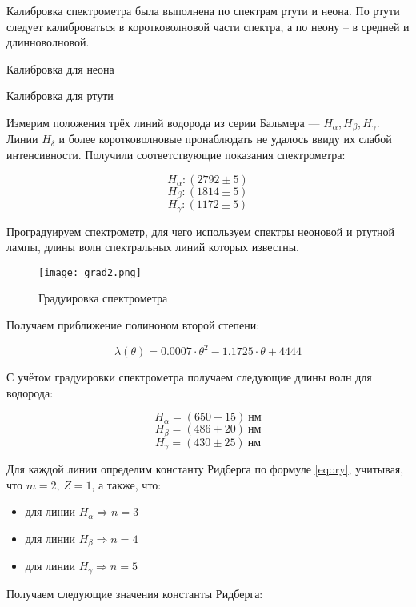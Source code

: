 Калибровка спектрометра была выполнена по спектрам ртути и неона. По ртути
следует калиброваться в коротковолновой части спектра, а по неону -- в средней и
длинноволновой.

\begin{table}[h!]
  \centering
  \caption{Калибровка для неона}
  
  \label{tb1}
\end{table}

\begin{table}[h!]
  \centering
  \caption{Калибровка для ртути}
  
  \label{tb2}
\end{table}

Измерим положения трёх линий водорода из серии Бальмера --- $H_{\alpha},
  H_{\beta}, H_{\gamma}$. Линии $H_{\delta}$ и более коротковолновые
пронаблюдать не удалось ввиду их слабой интенсивности.  Получили
соответствующие показания спектрометра:

\[  H_{\alpha}: (2792\pm 5) \]
\[  H_{\beta} : (1814 \pm 5) \]
\[ H_{\gamma} : (1172 \pm 5) \]

Проградуируем спектрометр, для чего используем спектры неоновой и ртутной
лампы, длины волн спектральных линий которых известны.

\begin{figure}[h!]
  \centering
  \texttt{[image: grad2.png]}
  \caption{Градуировка спектрометра}
  \label{al}
\end{figure}

Получаем приближение полиноном второй степени:

\[ \lambda\left(\theta\right) = 0.0007\cdot\theta^{2} - 1.1725\cdot \theta + 4444 \]


С учётом градуировки спектрометра получаем следующие длины волн для
водорода:


\[  H_{\alpha} = (650\pm 15)\ \text{нм} \]
\[  H_{\beta} = (486\pm 20)\ \text{нм} \]
\[  H_{\gamma} = (430\pm  25)\  \text{нм} \]


Для каждой линии определим константу Ридберга по формуле \eqref{eq::ry},
учитывая, что $m=2$, $Z=1$, а также, что:

\begin{itemize}
  \item для линии $H_{\alpha} \Rightarrow n=3$
  \item для линии $H_{\beta}  \Rightarrow n=4$
  \item для линии $H_{\gamma} \Rightarrow n=5$
\end{itemize}
Получаем следующие значения константы Ридберга:

